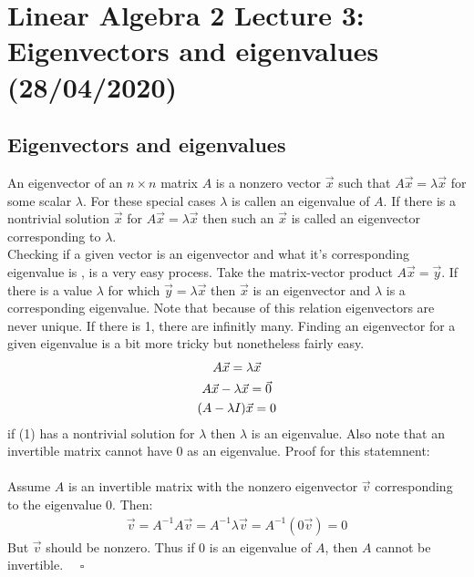 \documentclass[11pt, a4paper]{article}
\newcommand*{\qed}{\hfill\ensuremath{\quad\square}}%
\begin{document}
\setcounter{section}{2}
\setcounter{equation}{0}


\section{Linear Algebra 2 Lecture 3: Eigenvectors and eigenvalues (28/04/2020)}
\subsection{Eigenvectors and eigenvalues}
An eigenvector of an $n \times n$ matrix $A$ is a nonzero vector $\vec{x}$ such that $A\vec{x} = \lambda \vec{x}$ for some scalar $\lambda$. For these special cases $\lambda$ is callen an eigenvalue of $A$. If there is a nontrivial solution $\vec{x}$ for $A\vec{x} = \lambda \vec{x}$ then such an $\vec{x}$ is called an eigenvector corresponding to $\lambda$.\\
Checking if a given vector is an eigenvector and what it's corresponding eigenvalue is , is a very easy process. Take the matrix-vector product $A\vec{x} = \vec{y}$. If there is a value $\lambda$ for which $\vec{y} = \lambda \vec{x}$ then $\vec{x}$ is an eigenvector and $\lambda$ is a corresponding eigenvalue. Note that because of this relation eigenvectors are never unique. If there is 1, there are infinitly many. Finding an eigenvector for a given eigenvalue is a bit more tricky but nonetheless fairly easy.
\begin{gather}
  A\vec{x} = \lambda \vec{x} \notag \\
  A\vec{x} - \lambda \vec{x} = \vec{0} \notag \\
  (A-\lambda I)\vec{x} = 0
\end{gather}
if (1) has a nontrivial solution for $\lambda$ then $\lambda$ is an eigenvalue. Also note that an invertible matrix cannot have 0 as an eigenvalue. Proof for this statemnent:\\
\\
Assume $A$ is an invertible matrix with the nonzero eigenvector $\vec{v}$ corresponding to the eigenvalue $0$. Then:
\begin{gather*}
  \vec{v} = A^{-1}A\vec{v} = A^{-1}\lambda \vec{v} = A^{-1}(0\vec{v}) = 0
\end{gather*}
But $\vec{v}$ should be nonzero. Thus if $0$ is an eigenvalue of $A$, then $A$ cannot be invertible. \qed
\end{document}
